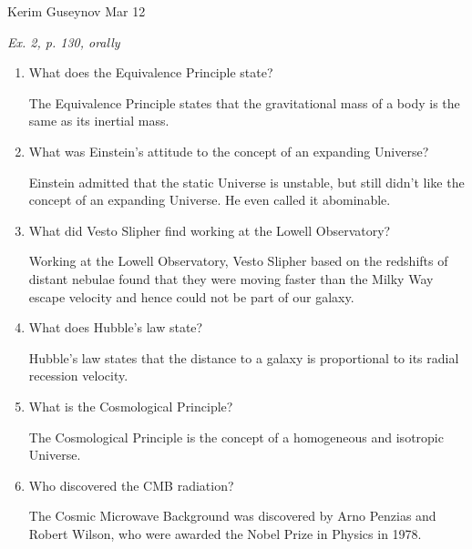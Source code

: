\documentclass[a4paper, 12pt]{article}
\begin{document}
\noindent
Kerim Guseynov
\hfill
Mar 12

\begin{center}
	\textit{Ex. 2, p. 130, orally}
\end{center}

\begin{enumerate}
	\item What does the Equivalence Principle state?

		The Equivalence Principle states that the gravitational mass of a body is the same as its inertial mass.

	\item What was Einstein's attitude to the concept of an expanding Universe?

		Einstein admitted that the static Universe is unstable, but still didn't like the concept of an expanding Universe. He even called it abominable.

	\item What did Vesto Slipher find working at the Lowell Observatory?

		Working at the Lowell Observatory, Vesto Slipher based on the redshifts of distant nebulae found that they were moving faster than the Milky Way escape velocity and hence could not be part of our galaxy.

	\item What does Hubble's law state?

		Hubble's law states that the distance to a galaxy is proportional to its radial recession velocity.

	\item What is the Cosmological Principle?

		The Cosmological Principle is the concept of a homogeneous and isotropic Universe.

	\item Who discovered the CMB radiation?

		The Cosmic Microwave Background was discovered by Arno Penzias and Robert Wilson, who were awarded the Nobel Prize in Physics in 1978.
\end{enumerate}
\end{document}
